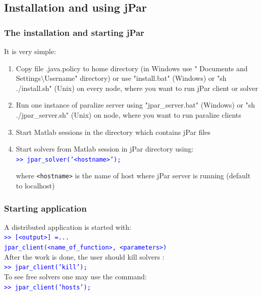 \documentclass{beamer}
\begin{document}
\begin{frame}[fragile]
\end{frame}
\begin{frame}[fragile]
\section{Installation and using jPar}
\frametitle{The installation and starting jPar}
It is very simple:
\begin{enumerate}
\item Copy file .java.policy to home directory (in Windows use
   " Documents and Settings$\setminus$Username" directory) or use "install.bat" (Windows)
   or "sh ./install.sh" (Unix) on every node, where you want to run
   jPar client or solver
\item Run one instance of paralize server using "jpar\_server.bat" (Windows)
   or "sh ./jpar\_server.sh" (Unix) on node, where you want to run paralize
   clients
\item Start Matlab sessions in the directory which contains
   jPar files
\item Start solvers from Matlab session in jPar directory
   using:\\

   \textcolor{blue}{\tt >> jpar\_solver('<hostname>');}

   where {\tt <hostname>} is the name of host where jPar server is running
   (default to localhost)\\
\end{enumerate}
\end{frame}
\begin{frame}
\frametitle{Starting application}
A distributed application is started with:\\
\vskip 0.2cm
\textcolor{blue}{\tt >> [<output>] =...}\\
 \hspace{0.5cm} \textcolor{blue}{\tt jpar\_client(<name\_of\_function>, <parameters>)}  \\
\vskip 0.2cm
After the work is done, the user should kill solvers :\\
\vskip 0.2cm
\textcolor{blue}   {\tt >> jpar\_client('kill');}\\
\vskip 0.2cm
To see free solvers one may use the command:\\
\vskip 0.2cm
 \textcolor{blue}   {\tt >> jpar\_client('hosts');}

\end{frame}
\end{document}
